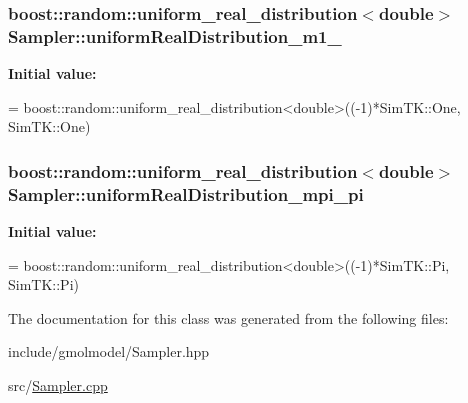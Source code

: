 \subsubsection[{\texorpdfstring{uniform\+Real\+Distribution\+\_\+m1\+\_\+1}{uniformRealDistribution_m1_1}}]{\setlength{\rightskip}{0pt plus 5cm}boost\+::random\+::uniform\+\_\+real\+\_\+distribution$<$double$>$ Sampler\+::uniform\+Real\+Distribution\+\_\+m1\+\_}\hypertarget{classSampler_aa05d95f8667613e9d802081ab343bc72}{}\label{classSampler_aa05d95f8667613e9d802081ab343bc72}
{\bfseries Initial value\+:}
\begin{DoxyCode}
=
            boost::random::uniform\_real\_distribution<double>((-1)*SimTK::One, SimTK::One)
\end{DoxyCode}
\subsubsection[{\texorpdfstring{uniform\+Real\+Distribution\+\_\+mpi\+\_\+pi}{uniformRealDistribution_mpi_pi}}]{\setlength{\rightskip}{0pt plus 5cm}boost\+::random\+::uniform\+\_\+real\+\_\+distribution$<$double$>$ Sampler\+::uniform\+Real\+Distribution\+\_\+mpi\+\_\+pi}\hypertarget{classSampler_a514a239abb55e5b7fb56d30fb2d1e695}{}\label{classSampler_a514a239abb55e5b7fb56d30fb2d1e695}
{\bfseries Initial value\+:}
\begin{DoxyCode}
=
            boost::random::uniform\_real\_distribution<double>((-1)*SimTK::Pi, SimTK::Pi)
\end{DoxyCode}


The documentation for this class was generated from the following files\+:\begin{DoxyCompactItemize}
\item 
include/gmolmodel/Sampler.\+hpp\item 
src/\hyperlink{Sampler_8cpp}{Sampler.\+cpp}\end{DoxyCompactItemize}
